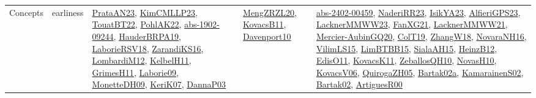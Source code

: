 {\begin{longtable}{lp{3cm}>{\raggedright}p{6cm}>{\raggedright}p{6cm}p{8cm}}
Concepts & earliness & \href{articles/PrataAN23.pdf}{PrataAN23}\cite{PrataAN23}, \href{papers/KimCMLLP23.pdf}{KimCMLLP23}\cite{KimCMLLP23}, \href{papers/TouatBT22.pdf}{TouatBT22}\cite{TouatBT22}, \href{articles/PohlAK22.pdf}{PohlAK22}\cite{PohlAK22}, \href{articles/abs-1902-09244.pdf}{abs-1902-09244}\cite{abs-1902-09244}, \href{articles/HauderBRPA19.pdf}{HauderBRPA19}\cite{HauderBRPA19}, \href{articles/LaborieRSV18.pdf}{LaborieRSV18}\cite{LaborieRSV18}, \href{articles/ZarandiKS16.pdf}{ZarandiKS16}\cite{ZarandiKS16}, \href{articles/LombardiM12.pdf}{LombardiM12}\cite{LombardiM12}, \href{articles/KelbelH11.pdf}{KelbelH11}\cite{KelbelH11}, \href{papers/GrimesH11.pdf}{GrimesH11}\cite{GrimesH11}, \href{papers/Laborie09.pdf}{Laborie09}\cite{Laborie09}, \href{papers/MonetteDH09.pdf}{MonetteDH09}\cite{MonetteDH09}, \href{papers/KeriK07.pdf}{KeriK07}\cite{KeriK07}, \href{papers/DannaP03.pdf}{DannaP03}\cite{DannaP03} & \href{articles/MengZRZL20.pdf}{MengZRZL20}\cite{MengZRZL20}, \href{articles/KovacsB11.pdf}{KovacsB11}\cite{KovacsB11}, \href{papers/Davenport10.pdf}{Davenport10}\cite{Davenport10} & \href{articles/abs-2402-00459.pdf}{abs-2402-00459}\cite{abs-2402-00459}, \href{articles/NaderiRR23.pdf}{NaderiRR23}\cite{NaderiRR23}, \href{articles/IsikYA23.pdf}{IsikYA23}\cite{IsikYA23}, \href{articles/AlfieriGPS23.pdf}{AlfieriGPS23}\cite{AlfieriGPS23}, \href{articles/LacknerMMWW23.pdf}{LacknerMMWW23}\cite{LacknerMMWW23}, \href{articles/FanXG21.pdf}{FanXG21}\cite{FanXG21}, \href{papers/LacknerMMWW21.pdf}{LacknerMMWW21}\cite{LacknerMMWW21}, \href{papers/Mercier-AubinGQ20.pdf}{Mercier-AubinGQ20}\cite{Mercier-AubinGQ20}, \href{papers/ColT19.pdf}{ColT19}\cite{ColT19}, \href{articles/ZhangW18.pdf}{ZhangW18}\cite{ZhangW18}, \href{articles/NovaraNH16.pdf}{NovaraNH16}\cite{NovaraNH16}, \href{papers/VilimLS15.pdf}{VilimLS15}\cite{VilimLS15}, \href{papers/LimBTBB15.pdf}{LimBTBB15}\cite{LimBTBB15}, \href{papers/SialaAH15.pdf}{SialaAH15}\cite{SialaAH15}, \href{papers/HeinzB12.pdf}{HeinzB12}\cite{HeinzB12}, \href{papers/EdisO11.pdf}{EdisO11}\cite{EdisO11}, \href{articles/KovacsK11.pdf}{KovacsK11}\cite{KovacsK11}, \href{articles/ZeballosQH10.pdf}{ZeballosQH10}\cite{ZeballosQH10}, \href{articles/NovasH10.pdf}{NovasH10}\cite{NovasH10}, \href{papers/KovacsV06.pdf}{KovacsV06}\cite{KovacsV06}, \href{papers/QuirogaZH05.pdf}{QuirogaZH05}\cite{QuirogaZH05}, \href{papers/Bartak02a.pdf}{Bartak02a}\cite{Bartak02a}, \href{papers/KamarainenS02.pdf}{KamarainenS02}\cite{KamarainenS02}, \href{papers/Bartak02.pdf}{Bartak02}\cite{Bartak02}, \href{articles/ArtiguesR00.pdf}{ArtiguesR00}\cite{ArtiguesR00}\\

\end{longtable}}
